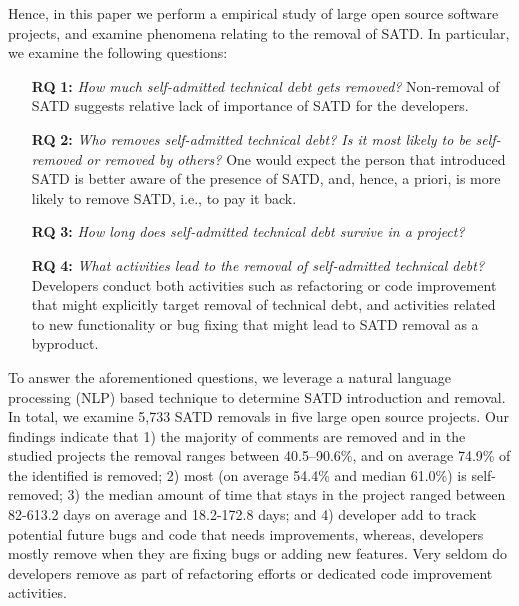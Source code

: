 Hence, in this paper we perform a  empirical study of large open source software projects, and examine phenomena relating to the removal of SATD. In particular, we examine the following questions:
\begin{itemize}
	\item[\textbf{RQ}]\textbf{1:} \emph{How much self-admitted technical debt gets removed?} Non-removal of SATD suggests relative lack of importance of SATD for the developers. 
	\item[\textbf{RQ}]\textbf{2:} \emph{Who removes self-admitted technical debt? Is it most likely to be self-removed or removed by others?} One would expect the person that introduced SATD is better aware of the presence of SATD, and, hence, a priori, is more likely to remove SATD, i.e., to pay it back.
	\item[\textbf{RQ}]\textbf{3:} \emph{How long does self-admitted technical debt survive in a project?}
	\item[\textbf{RQ}]\textbf{4:} \emph{What activities lead to the removal of self-admitted technical debt?} Developers conduct both activities such as refactoring or code improvement that might explicitly target removal of technical debt, and activities related to new functionality or bug fixing that might lead to SATD removal as a byproduct.
\end{itemize}

To answer the aforementioned questions, we leverage a natural language processing (NLP) based technique  to determine SATD introduction and removal. In total, we examine 5,733 SATD removals in five large open source projects. Our findings indicate that 1) the majority of \SATD comments are removed and in the studied projects the removal ranges between 40.5--90.6\%, and on average 74.9\% of the identified \SATD is removed; 2) most \SATD (on average 54.4\% and median 61.0\%) is self-removed; 3) the median amount of time that \SATD stays in the project ranged between 82-613.2 days on average and 18.2-172.8 days; and 4) developer add \SATD to track potential future bugs and code that needs improvements, whereas, developers mostly remove \SATD when they are fixing bugs or adding new features. Very seldom do developers remove \SATD as part of refactoring efforts or dedicated code improvement activities.

